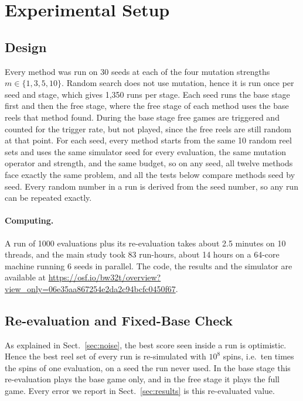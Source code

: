 \section{Experimental Setup}
\label{sec:setup}

\subsection{Design}
\label{sec:design}

Every method was run on 30 seeds at each of the four mutation strengths $m \in \{1, 3, 5, 10\}$. Random search does not use mutation, hence it is run once per seed and stage, which gives 1{,}350 runs per stage. Each seed runs the base stage first and then the free stage, where the free stage of each method uses the base reels that method found. During the base stage free games are triggered and counted for the trigger rate, but not played, since the free reels are still random at that point. For each seed, every method starts from the same 10 random reel sets and uses the same simulator seed for every evaluation, the same mutation operator and strength, and the same budget, so on any seed, all twelve methods face exactly the same problem, and all the tests below compare methods seed by seed. Every random number in a run is derived from the seed number, so any run can be repeated exactly.

\paragraph{Computing.} A run of 1000 evaluations plus its re-evaluation takes about 2.5 minutes on 10 threads, and the main study took 83 run-hours, about 14 hours on a 64-core machine running 6 seeds in parallel. The code, the results and the simulator are available at \url{https://osf.io/bw32t/overview?view_only=06e35aa867254e2da2c94bcfc0450f67}.

\subsection{Re-evaluation and Fixed-Base Check}
\label{sec:reeval}

As explained in Sect.~\ref{sec:noise}, the best score seen inside a run is optimistic. Hence the best reel set of every run is re-simulated with $10^8$ spins, i.e.\ ten times the spins of one evaluation, on a seed the run never used. In the base stage this re-evaluation plays the base game only, and in the free stage it plays the full game. Every error we report in Sect.~\ref{sec:results} is this re-evaluated value.

